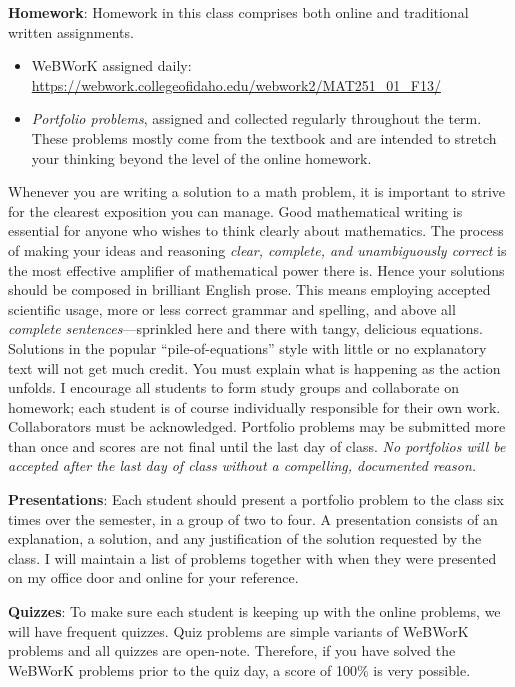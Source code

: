 \documentclass[12pt,twoside]{amsart}
\begin{document}
\textbf{Homework}: Homework in this class comprises both online and traditional written assignments.
\begin{itemize}
    \item WeBWorK assigned daily: \url{https://webwork.collegeofidaho.edu/webwork2/MAT251_01_F13/}
    \item \emph{Portfolio problems}, assigned and collected regularly throughout the term. These problems mostly come from the textbook and are intended to stretch your thinking beyond the level of the online homework.
\end{itemize}
Whenever you are writing a solution to a math problem, it is important to strive for the clearest exposition you can manage. Good mathematical writing is essential for anyone who wishes to think clearly about mathematics. The process of making your ideas and reasoning \emph{clear, complete, and unambiguously correct} is the most effective amplifier of mathematical power there is. Hence your solutions should be composed in brilliant English prose. This means employing accepted scientific usage, more or less correct grammar and spelling, and above all \emph{complete sentences}---sprinkled here and there with tangy, delicious equations. Solutions in the popular ``pile-of-equations'' style with little or no explanatory text will not get much credit. You must explain what is happening as the action unfolds. I encourage all students to form study groups and collaborate on homework; each student is of course individually responsible for their own work. Collaborators must be acknowledged. Portfolio problems may be submitted more than once and scores are not final until the last day of class. \emph{No portfolios will be accepted after the last day of class without a compelling, documented reason.}

\textbf{Presentations}: Each student should present a portfolio problem to the class six times over the semester, in a group of two to four. A presentation consists of an explanation, a solution, and any justification of the solution requested by the class. I will maintain a list of problems together with when they were presented on my office door and online for your reference.

\textbf{Quizzes}: To make sure each student is keeping up with the online problems, we will have frequent quizzes. Quiz problems are simple variants of WeBWorK problems and all quizzes are open-note. Therefore, if you have solved the WeBWorK problems prior to the quiz day, a score of 100\% is very possible.
\end{document}
